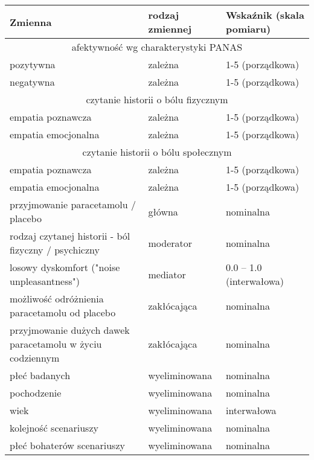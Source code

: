 \documentclass[12pt]{article}
\begin{document}
\begin{tabular}{|p{9cm}|l|l|}
  \hline
  \textbf{Zmienna} & \textbf{rodzaj zmiennej} & \textbf{Wskaźnik (skala pomiaru)} \\
  \hline
  \multicolumn{3}{|c|}{afektywność wg charakterystyki PANAS } \\
  \hline
  pozytywna & zależna & 1-5 (porządkowa) \\
  negatywna & zależna & 1-5 (porządkowa) \\
  \hline
  \multicolumn{3}{|c|}{czytanie historii o bólu fizycznym} \\
  \hline
  empatia poznawcza & zależna & 1-5 (porządkowa) \\
  empatia emocjonalna & zależna & 1-5 (porządkowa) \\
  \hline
  \multicolumn{3}{|c|}{czytanie historii o bólu społecznym} \\
  \hline
  empatia poznawcza & zależna & 1-5 (porządkowa) \\
  empatia emocjonalna & zależna & 1-5 (porządkowa) \\
  \hline
  \hline
  przyjmowanie paracetamolu / placebo & główna & nominalna \\
  \hline
  rodzaj czytanej historii - ból fizyczny / psychiczny & moderator & nominalna \\
  \hline
  losowy dyskomfort ("noise unpleasantness") & mediator & 0.0 -- 1.0 (interwałowa) \\
  \hline
  możliwość odróżnienia paracetamolu od placebo & zakłócająca & nominalna \\
  przyjmowanie dużych dawek paracetamolu w życiu codziennym & zakłócająca & nominalna \\
  \hline
  płeć badanych & wyeliminowana & nominalna \\
  pochodzenie & wyeliminowana & nominalna \\
  wiek & wyeliminowana & interwałowa \\
  kolejność scenariuszy & wyeliminowana & nominalna \\
  płeć bohaterów scenariuszy & wyeliminowana & nominalna \\
  \hline
\end{tabular}
\end{document}
